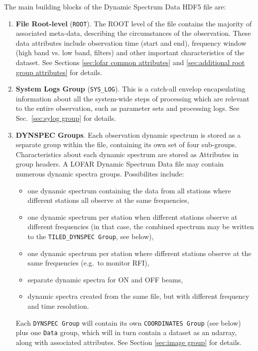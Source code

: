 \documentclass[a4paper,10pt,bibtotoc]{scrartcl}
\begin{document}
The main building blocks of the Dynamic Spectrum Data HDF5 file are:

\begin{enumerate} \parskip 0pt
\item \textbf{File Root-level} (\verb|ROOT|). The ROOT level of the
  file contains the majority of associated meta-data, describing the
  circumstances of the observation. These data attributes include
  observation time (start and end), frequency window (high band
  vs. low band, filters) and other important characteristics of the
  dataset. See Sections \ref{sec:lofar common attributes} and \ref{sec:additional root group attributes} for details.
  
\item \textbf{System Logs Group} (\verb|SYS_LOG|). This is a catch-all
  envelop encapsulating information about all the system-wide steps of
  processing which are relevant to the entire observation, such as
  parameter sets and processing logs. See Sec.~\ref{sec:sylog group} for details.
  
\item \textbf{DYNSPEC Groups}. Each observation dynamic spectrum
is stored as a
separate group within the file, containing its own set of four sub-groups. 
Characteristics about each dynamic spectrum are stored as Attributes in group
headers. 
A LOFAR Dynamic Spectrum Data file may contain numerous dynamic spectra groups.
Possibilites include:
\begin{itemize}
\item one dynamic spectrum containing the data from all stations where different
stations all observe at the same frequencies, 
\item one dynamic spectrum per station when different stations observe at different 
frequencies (in that case, the combined spectrum may be written to the
\texttt{TILED\_DYNSPEC Group}, see below),  
\item one dynamic spectrum per station where different stations observe at the 
same frequencies (e.g.~to monitor RFI), 
\item separate dynamic spectra for ON and OFF beams,
\item dynamic spectra created from the same file, but with
different frequency and time resolution.
\end{itemize}
Each \texttt{DYNSPEC Group} 
will contain its own \texttt{COORDINATES Group} (see below) 
plus one \texttt{Data} group, 
which will in turn contain a dataset as an
ndarray, along with associated attributes. 
See Section \ref{sec:image group} for details.


\end{enumerate}
\end{document}
